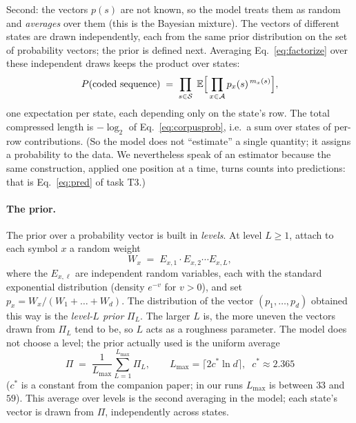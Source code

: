 \documentclass[11pt]{article}
\newcommand{\field}[1]{\paragraph{#1.}}
\begin{document}
Second: the vectors $p(s)$ are not known, so the model treats them
as random and \emph{averages} over them (this is the Bayesian
mixture).  The vectors of different states are drawn independently,
each from the same prior distribution on the set of probability
vectors; the prior is defined next.  Averaging
Eq.~\eqref{eq:factorize} over these independent draws keeps the
product over states:
\begin{equation}
  P(\text{coded sequence})
  \;=\; \prod_{s \in \mathcal{S}}
  \;\mathbb{E}\Bigl[\, \prod_{x \in \mathcal{A}}
  p_x(s)^{\,m_x(s)} \Bigr],
  \label{eq:corpusprob}
\end{equation}
one expectation per state, each depending only on the state's row.
The total compressed length is $-\log_2$ of
Eq.~\eqref{eq:corpusprob}, i.e.\ a sum over states of per-row
contributions.  (So the model does not ``estimate'' a single
quantity; it assigns a probability to the data.  We nevertheless
speak of an estimator because the same construction, applied one
position at a time, turns counts into predictions: that is
Eq.~\eqref{eq:pred} of task T3.)

\field{The prior}
The prior over a probability vector is built in \emph{levels}.  At
level $L \ge 1$, attach to each symbol $x$ a random weight
\[
  W_x \;=\; E_{x,1} \cdot E_{x,2} \cdots E_{x,L},
\]
where the $E_{x,\ell}$ are independent random variables, each with
the standard exponential distribution (density $e^{-v}$ for $v >
0$), and set $p_x = W_x / (W_1 + \dots + W_d)$.  The distribution
of the vector $(p_1, \dots, p_d)$ obtained this way is the
\emph{level-$L$ prior} $\Pi_L$.  The larger $L$ is, the more
uneven the vectors drawn from $\Pi_L$ tend to be, so $L$ acts as a
roughness parameter.  The model does not choose a level; the prior
actually used is the uniform average
\[
  \Pi \;=\; \frac{1}{L_{\max}} \sum_{L=1}^{L_{\max}} \Pi_L,
  \qquad L_{\max} = \lceil 2 c^{*} \ln d \rceil,\;\;
  c^{*} \approx 2.365
\]
($c^{*}$ is a constant from the companion paper; in our runs
$L_{\max}$ is between $33$ and $59$).  This average over levels is
the second averaging in the model; each state's vector is drawn from
$\Pi$, independently across states.
\end{document}
